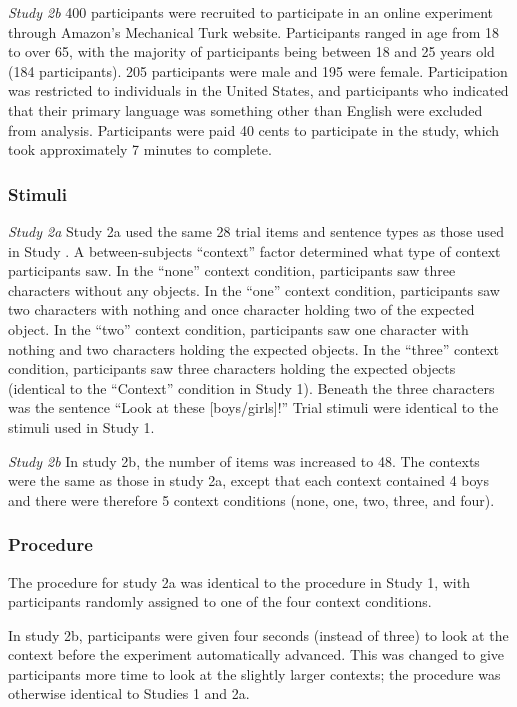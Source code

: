 \documentclass[10pt,letterpaper]{article}
\begin{document}
\emph{Study 2b}
400 participants were recruited to participate in an online experiment through Amazon's Mechanical Turk website.  Participants ranged in age from 18 to over 65, with the majority of participants being between 18 and 25 years old (184 participants).  205 participants were male and 195 were female.  Participation was restricted to individuals in the United States, and participants who indicated that their primary language was something other than English were excluded from analysis.  Participants were paid 40 cents to participate in the study, which took approximately 7 minutes to complete.

\subsubsection{Stimuli}
\emph{Study 2a} 
Study 2a used the same 28 trial items and sentence types as those used in Study .  A between-subjects ``context'' factor determined what type of context participants saw.  In the ``none'' context condition, participants saw three characters without any objects.  In the ``one'' context condition, participants saw two characters with nothing and once character holding two of the expected object.  In the ``two'' context condition, participants saw one character with nothing and two characters holding the expected objects.  In the ``three'' context condition, participants saw three characters holding the expected objects (identical to the ``Context'' condition in Study 1).  Beneath the three characters was the sentence ``Look at these [boys/girls]!''  Trial stimuli were identical to the stimuli used in Study 1.  

\emph{Study 2b}
In study 2b, the number of items was increased to 48.  The contexts were the same as those in study 2a, except that each context contained 4 boys and there were therefore 5 context conditions (none, one, two, three, and four).  

\subsubsection{Procedure}
 The procedure for study 2a was identical to the procedure in Study 1, with participants randomly assigned to one of the four context conditions.  
 
 In study 2b, participants were given four seconds (instead of three) to look at the context before the experiment automatically advanced.  This was changed to give participants more time to look at the slightly larger contexts; the procedure was otherwise identical to Studies 1 and 2a.  
 
\end{document}
